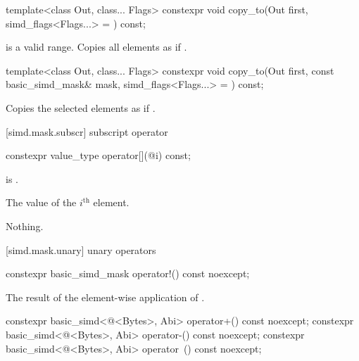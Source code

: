 \begin{itemdecl}
template<class Out, class... Flags>
  constexpr void copy_to(Out first, simd_flags<Flags...> = {}) const;
\end{itemdecl}

\begin{itemdescr}
  \MaskStoreDescr
    { is a valid range.}
    {Copies all  elements as if  \foralli.}
\end{itemdescr}

\begin{itemdecl}
template<class Out, class... Flags>
  constexpr void copy_to(Out first, const basic_simd_mask& mask, simd_flags<Flags...> = {}) const;
\end{itemdecl}

\begin{itemdescr}
  \MaskStoreDescr
  {\validMaskedRange}
  {Copies the selected elements as if  \forallmaskedi.}
\end{itemdescr}

[simd.mask.subscr]{ subscript operator}

\begin{itemdecl}
constexpr value_type operator[](@\simdsizetype@ i) const;
\end{itemdecl}

\begin{itemdescr}
  \pnum\expects
   is .

  \pnum\returns
  The value of the $i^\text{th}$ element.

  \pnum\throws Nothing.
\end{itemdescr}

[simd.mask.unary]{ unary operators}

\begin{itemdecl}
constexpr basic_simd_mask operator!() const noexcept;
\end{itemdecl}

\begin{itemdescr}
  \pnum\returns
  The result of the element-wise application of .
\end{itemdescr}

\begin{itemdecl}
constexpr basic_simd<@\integerfrom@<Bytes>, Abi> operator+() const noexcept;
constexpr basic_simd<@\integerfrom@<Bytes>, Abi> operator-() const noexcept;
constexpr basic_simd<@\integerfrom@<Bytes>, Abi> operator~() const noexcept;
\end{itemdecl}

